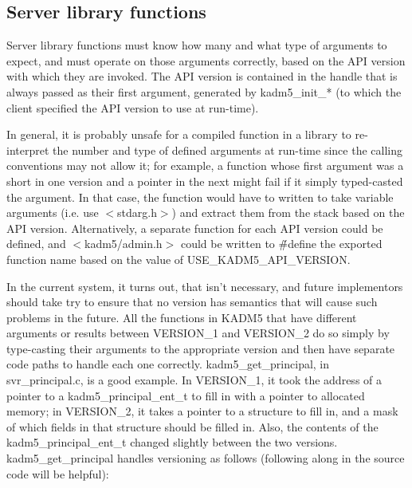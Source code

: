 \subsection{Server library functions}

Server library functions must know how many and what type of arguments
to expect, and must operate on those arguments correctly, based on the
API version with which they are invoked.  The API version is contained
in the handle that is always passed as their first argument, generated
by kadm5_init_* (to which the client specified the API version to use
at run-time).

In general, it is probably unsafe for a compiled function in a library
to re-interpret the number and type of defined arguments at run-time
since the calling conventions may not allow it; for example, a
function whose first argument was a short in one version and a pointer
in the next might fail if it simply typed-casted the argument.  In
that case, the function would have to written to take variable
arguments (i.e. use $<$stdarg.h$>$) and extract them from the stack
based on the API version.  Alternatively, a separate function for each
API version could be defined, and $<$kadm5/admin.h$>$ could be written
to \v{\#define} the exported function name based on the value of
USE_KADM5_API_VERSION.

In the current system, it turns out, that isn't necessary, and future
implementors should take try to ensure that no version has semantics
that will cause such problems in the future.  All the functions in
KADM5 that have different arguments or results between VERSION_1 and
VERSION_2 do so simply by type-casting their arguments to the
appropriate version and then have separate code paths to handle each
one correctly.  kadm5_get_principal, in svr_principal.c, is a good
example.  In VERSION_1, it took the address of a pointer to a
kadm5_principal_ent_t to fill in with a pointer to allocated memory;
in VERSION_2, it takes a pointer to a structure to fill in, and a mask
of which fields in that structure should be filled in.  Also, the
contents of the kadm5_principal_ent_t changed slightly between the two
versions.  kadm5_get_principal handles versioning as follows
(following along in the source code will be helpful):

